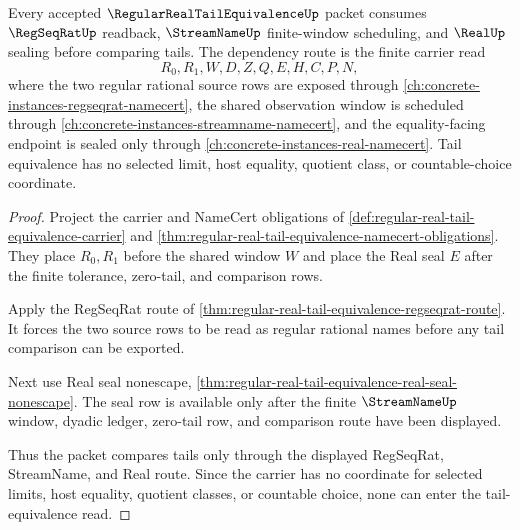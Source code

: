 \begin{theorem}
\label{thm:regular-real-tail-equivalence-regseqrat-streamname-route}
Every accepted $\RegularRealTailEquivalenceUp$ packet consumes $\RegSeqRatUp$ readback, $\StreamNameUp$ finite-window scheduling, and $\RealUp$ sealing before comparing tails. The dependency route is the finite carrier read
$$
R_0,R_1,W,D,Z,Q,E,H,C,P,N,
$$
where the two regular rational source rows are exposed through \autoref{ch:concrete-instances-regseqrat-namecert}, the shared observation window is scheduled through \autoref{ch:concrete-instances-streamname-namecert}, and the equality-facing endpoint is sealed only through \autoref{ch:concrete-instances-real-namecert}. Tail equivalence has no selected limit, host equality, quotient class, or countable-choice coordinate.
\end{theorem}
\begin{proof}
Project the carrier and NameCert obligations of \autoref{def:regular-real-tail-equivalence-carrier} and \autoref{thm:regular-real-tail-equivalence-namecert-obligations}. They place $R_0,R_1$ before the shared window $W$ and place the Real seal $E$ after the finite tolerance, zero-tail, and comparison rows.

Apply the RegSeqRat route of \autoref{thm:regular-real-tail-equivalence-regseqrat-route}. It forces the two source rows to be read as regular rational names before any tail comparison can be exported.

Next use Real seal nonescape, \autoref{thm:regular-real-tail-equivalence-real-seal-nonescape}. The seal row is available only after the finite $\StreamNameUp$ window, dyadic ledger, zero-tail row, and comparison route have been displayed.

Thus the packet compares tails only through the displayed RegSeqRat, StreamName, and Real route. Since the carrier has no coordinate for selected limits, host equality, quotient classes, or countable choice, none can enter the tail-equivalence read.
\end{proof}
